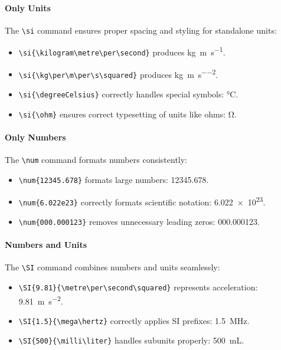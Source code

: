 \paragraph*{Only Units}

The \verb|\si| command ensures proper spacing and styling for standalone units:
\begin{itemize}
    \item \verb|\si{\kilogram\metre\per\second}| produces \si{\kilogram\metre\per\second}.
    \item \verb|\si{\kg\per\m\per\s\squared}| produces \si{\kg\per\m\per\s\squared}.
    \item \verb|\si{\degreeCelsius}| correctly handles special symbols: \si{\degreeCelsius}.
    \item \verb|\si{\ohm}| ensures correct typesetting of units like ohms: \si{\ohm}.
\end{itemize}

\paragraph*{Only Numbers}

The \verb|\num| command formats numbers consistently:
\begin{itemize}
    \item \verb|\num{12345.678}| formats large numbers: \num{12345.678}.
    \item \verb|\num{6.022e23}| correctly formats scientific notation: \num{6.022e23}.
    \item \verb|\num{000.000123}| removes unnecessary leading zeros: \num{000.000123}.
\end{itemize}

\paragraph*{Numbers and Units}

The \verb|\SI| command combines numbers and units seamlessly:
\begin{itemize}
    \item \verb|\SI{9.81}{\metre\per\second\squared}| represents acceleration: \SI{9.81}{\metre\per\second\squared}.
    \item \verb|\SI{1.5}{\mega\hertz}| correctly applies SI prefixes: \SI{1.5}{\mega\hertz}.
    \item \verb|\SI{500}{\milli\liter}| handles subunits properly: \SI{500}{\milli\liter}.
\end{itemize}

